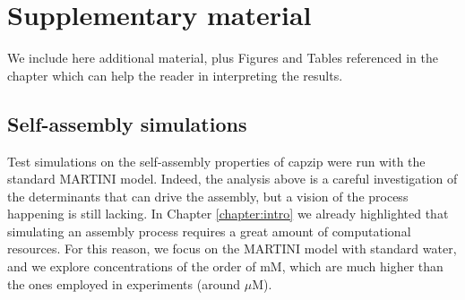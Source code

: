\clearpage


\section{Supplementary material} \label{sec:ch3_SI}

We include here additional material, plus Figures and Tables referenced in the chapter which can help the reader in interpreting the results.

\subsection{Self-assembly simulations}
Test simulations on the self-assembly properties of capzip were run with the standard MARTINI model. Indeed, the analysis above is a careful investigation of the determinants that can drive the assembly, but a vision of the process happening is still lacking.
%
In Chapter \ref{chapter:intro} we already highlighted that simulating an assembly process requires a great amount of computational resources. For this reason, we focus on the MARTINI model with standard water, and we explore concentrations of the order of mM, which are much higher than the ones employed in experiments (around $\mu$M).

